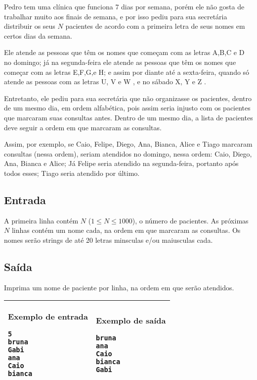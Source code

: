 Pedro tem uma clínica que funciona 7 dias por semana, porém ele não gosta
de trabalhar muito aos finais de semana, e por isso pediu para sua secretária
distribuir os seus $N$ pacientes de acordo com a primeira letra de seus nomes em
certos dias da semana.

Ele atende as pessoas que têm os nomes que começam
com as letras A,B,C e D no domingo; já na segunda-feira ele atende as pessoas que têm
os nomes que começar com as letras E,F,G,e H; e assim por diante até
a sexta-feira, quando só atende as pessoas com as letras U, V e W , e no sábado X,
Y e Z .

Entretanto, ele pediu para sua secretária que não organizasse os pacientes,
    dentro de um mesmo dia, em ordem
alfabética, pois assim seria injusto com os pacientes que marcaram suas consultas
antes. Dentro de um mesmo dia, a lista de pacientes deve seguir a ordem em que
marcaram as consultas.

Assim, por exemplo, se Caio, Felipe, Diego,
Ana, Bianca, Alice e Tiago marcaram consultas (nessa ordem),
seriam atendidos no domingo, nessa ordem: Caio, Diego, Ana, Bianca e Alice;
Já Felipe seria atendido na segunda-feira, portanto após todos esses; Tiago
seria atendido por último.

\subsection*{Entrada}

A primeira linha contém $N$ ($1 \leq N \leq 1000$), o número de pacientes. As
próximas $N$ linhas contém um nome cada, na ordem em que marcaram as consultas.
Os nomes serão strings de até 20 letras minsculas e/ou maiusculas cada.

\subsection*{Saída}

Imprima um nome de paciente por linha, na ordem em que serão atendidos.

\begin{table}[!h]
\centering
\begin{tabular}{|l|l|}
\hline
\begin{minipage}[t]{3in}
\textbf{Exemplo de entrada}
\begin{verbatim}
5
bruna
Gabi
ana
Caio
bianca
\end{verbatim}
\vspace{1mm}
\end{minipage}
&
\begin{minipage}[t]{3in}
\textbf{Exemplo de saída}
\begin{verbatim}
bruna
ana
Caio
bianca
Gabi
\end{verbatim}
\vspace{1mm}
\end{minipage} \\
\hline
\end{tabular}
\end{table}
